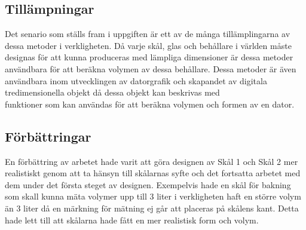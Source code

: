 \documentclass[12pt]{article}
\begin{document}
\subsection*{Tillämpningar}
Det senario som ställs fram i uppgiften är ett av de många tillämplingarna av dessa metoder i verkligheten. Då varje skål, glas och behållare i världen måste designas för att kunna produceras med lämpliga dimensioner är dessa metoder användbara för att beräkna volymen av dessa behållare. Dessa metoder är även användbara inom utvecklingen av datorgrafik och skapandet av digitala tredimensionella objekt då dessa objekt kan beskrivas med\\ funktioner som kan användas för att beräkna volymen och formen av en dator.

\subsection*{Förbättringar}
En förbättring av arbetet hade varit att göra designen av Skål 1 och Skål 2 mer realistiskt genom att ta hänsyn till skålarnas syfte och det fortsatta arbetet med dem under det första steget av designen. Exempelvis hade en skål för bakning som skall kunna mäta volymer upp till 3 liter i verkligheten haft en större volym än 3 liter då en märkning för mätning ej går att placeras på skålens kant. Detta hade lett till att skålarna hade fått en mer realistisk form och volym.
\end{document}
